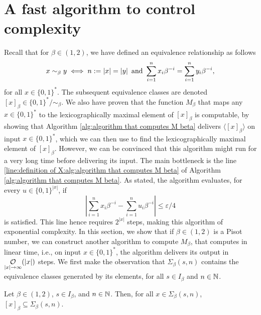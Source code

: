 
\section{A fast algorithm to control complexity}

\label{sec:a fast algorithm to control complexity}

Recall that for $\beta \in (1,2)$, we have defined an equivalence relationship as follows
\begin{equation}
    x \sim_\beta y \iff n := \len x = \len y \ \text{and} \ \sum_{i=1}^n x_i \beta^{-i} = \sum_{i=1}^n y_i \beta^{-i},
\end{equation}
for all $x \in \{0,1\}^\ast$. The subsequent equivalence classes are denoted $[x]_\beta \in \{0,1\}^\ast / \sim_\beta$. We also have proven that the function $M_\beta$ that maps any $x \in \{0,1\}^\ast$ to the lexicographically maximal element of $[x]_\beta$ is computable, by showing that Algorithm \ref{alg:algorithm that computes M beta} delivers $\langle [x]_\beta \rangle$ on input $x \in \{0,1\}^\ast$, which we can then use to find the lexicographically maximal element of $[x]_\beta$. However, we can be convinced that this algorithm might run for a very long time before delivering its input. The main bottleneck is the line \ref{line:definition of X:alg:algorithm that computes M beta} of Algorithm \ref{alg:algorithm that computes M beta}. As stated, the algorithm evaluates, for every $u \in \{0,1\}^{|x|}$, if 
\begin{equation}
    \left| \sum_{i=1}^n x_i \beta^{-i} - \sum_{i=1}^n u_i \beta^{-i}\right| \leq \varepsilon/4
\end{equation}
is satisfied. This line hence requires $2^{|x|}$ steps, making this algorithm of exponential complexity. In this section, we show that if $\beta \in (1,2)$ is a Pisot number, we can construct another algorithm to compute $M_\beta$, that computes in linear time, i.e., on input $x \in \{0,1\}^\ast$, the algorithm delivers its output in $\bigOw[|x|]{x}$ steps.
We first make the observation that $\Sigma_\beta(s,n)$ contains the equivalence classes generated by its elements, for all $s \in I_\beta$ and $n \in \mathbb{N}$.
\begin{lemma}\label{lem:sigma beta s n contains the equivalence classes}
    Let $\beta \in (1,2)$, $s \in I_\beta$, and $n \in \mathbb{N}$. Then, for all $x \in \Sigma_\beta(s,n)$, $[x]_\beta \subseteq \Sigma_\beta(s,n)$.
\end{lemma}
